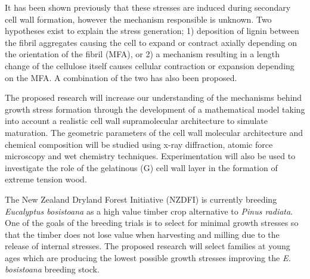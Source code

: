 It has been shown previously that these stresses are induced during secondary
cell wall formation, however the mechanism responsible is unknown. Two
hypotheses exist to explain the stress generation; 1) deposition of lignin
between the fibril aggregates causing the cell to expand or contract axially
depending on the orientation of the fibril (MFA), or 2) a mechanism resulting in
a length change of the cellulose itself causes cellular contraction or expansion
depending on the MFA. A combination of the two has also been proposed.

The proposed research will increase our understanding of the mechanisms behind
growth stress formation through the development of a mathematical model taking
into account a realistic cell wall supramolecular architecture to simulate
maturation. The geometric parameters of the cell wall molecular architecture and
chemical composition will be studied using x-ray diffraction, atomic force
microscopy and wet chemistry techniques. Experimentation will also be used to
investigate the role of the gelatinous (G) cell wall layer in the formation of
extreme tension wood.

The New Zealand Dryland Forest Initiative (NZDFI) is currently breeding
\textit{Eucalyptus bosistoana} as a high value timber crop alternative to
\textit{Pinus radiata}. One of the goals of the breeding trials is to select for
minimal growth stresses so that the timber does not lose value when harvesting
and milling due to the release of internal stresses. The proposed research will
select families at young ages which are producing the lowest possible growth
stresses improving the \textit{E. bosistoana} breeding stock.
